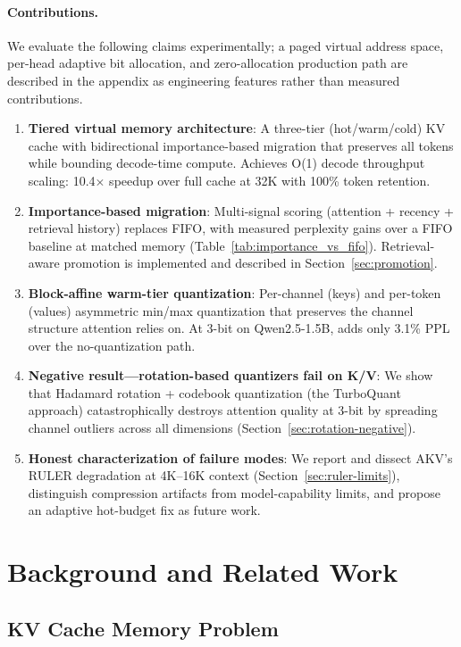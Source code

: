 \documentclass[11pt,a4paper]{article}
\begin{document}
\paragraph{Contributions.} We evaluate the following claims experimentally; a paged virtual address space, per-head adaptive bit allocation, and zero-allocation production path are described in the appendix as engineering features rather than measured contributions.
\begin{enumerate}
    \item \textbf{Tiered virtual memory architecture}: A three-tier (hot/warm/cold) KV cache with bidirectional importance-based migration that preserves all tokens while bounding decode-time compute. Achieves O(1) decode throughput scaling: 10.4$\times$ speedup over full cache at 32K with 100\% token retention.
    \item \textbf{Importance-based migration}: Multi-signal scoring (attention + recency + retrieval history) replaces FIFO, with measured perplexity gains over a FIFO baseline at matched memory (Table~\ref{tab:importance_vs_fifo}). Retrieval-aware promotion is implemented and described in Section~\ref{sec:promotion}.
    \item \textbf{Block-affine warm-tier quantization}: Per-channel (keys) and per-token (values) asymmetric min/max quantization that preserves the channel structure attention relies on. At 3-bit on Qwen2.5-1.5B, adds only 3.1\% PPL over the no-quantization path.
    \item \textbf{Negative result---rotation-based quantizers fail on K/V}: We show that Hadamard rotation + codebook quantization (the TurboQuant approach) catastrophically destroys attention quality at 3-bit by spreading channel outliers across all dimensions (Section~\ref{sec:rotation-negative}).
    \item \textbf{Honest characterization of failure modes}: We report and dissect AKV's RULER degradation at 4K--16K context (Section~\ref{sec:ruler-limits}), distinguish compression artifacts from model-capability limits, and propose an adaptive hot-budget fix as future work.
\end{enumerate}

\section{Background and Related Work}

\subsection{KV Cache Memory Problem}
\end{document}
